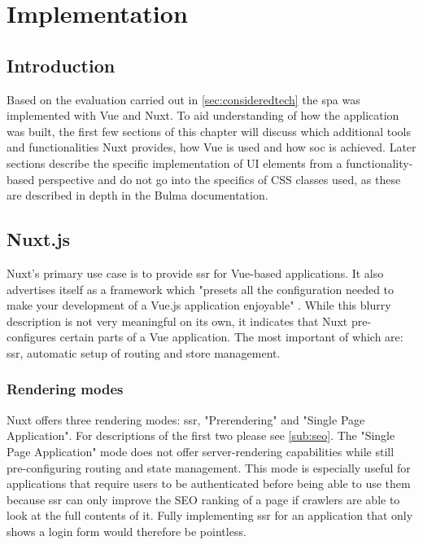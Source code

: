 \chapter[Implementation]{Implementation} \label{ch:implementation}

\section{Introduction}
Based on the evaluation carried out in \autoref{sec:consideredtech} the \acrlong{spa} was implemented with Vue and Nuxt. To aid understanding of how the application was built, the first few sections of this chapter will discuss which additional tools and functionalities Nuxt provides, how Vue is used and how \acrfull{soc} is achieved. Later sections describe the specific implementation of UI elements from a functionality-based perspective and do not go into the specifics of CSS classes used, as these are described in depth in the Bulma documentation.

\section{Nuxt.js}
Nuxt's primary use case is to provide \acrlong{ssr} for Vue-based applications. It also advertises itself as a framework which "presets all the configuration needed to make your development of a Vue.js application enjoyable" \cite{Nuxtjs:online}. While this blurry description is not very meaningful on its own, it indicates that Nuxt pre-configures certain parts of a Vue application. The most important of which are: \acrlong{ssr}, automatic setup of routing and store management.

\subsection{Rendering modes}
Nuxt offers three rendering modes: \acrshort{ssr}, "Prerendering" and "Single Page Application". For descriptions of the first two please see \autoref{sub:seo}. The "Single Page Application" mode does not offer server-rendering capabilities while still pre-configuring routing and state management. This mode is especially useful for applications that require users to be authenticated before being able to use them because \acrlong{ssr} can only improve the SEO ranking of a page if crawlers are able to look at the full contents of it. Fully implementing \acrshort{ssr} for an application that only shows a login form would therefore be pointless. 

